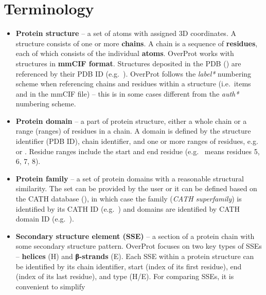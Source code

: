 \documentclass{article}
\begin{document}
\section{Terminology}

\begin{itemize}
  \item
    \textbf{Protein structure} -- a set of atoms with assigned 3D
    coordinates. A structure consists of one or more \textbf{chains}. A
    chain is a sequence of \textbf{residues}, each of which consists of the
    individual \textbf{atoms}. OverProt works with structures in
    \textbf{mmCIF format}. Structures deposited in the PDB 
    ()
    are referenced by their PDB ID (e.g.~). OverProt follows the
    \emph{label*} numbering scheme when referencing chains and residues
    within a structure (i.e.~items  and
     in the mmCIF file) -- this is in some cases
    different from the \emph{auth*} numbering scheme.
  \item
    \textbf{Protein domain} -- a part of protein structure, either a
    whole chain or a range (ranges) of residues in a chain. A domain is
    defined by the structure identifier (PDB ID), chain identifier, and one or more
    ranges of residues, e.g.~ or
    . Residue ranges include the start and end
    residue (e.g.~ means residues 5, 6, 7, 8).
  \item
    \textbf{Protein family} -- a set of protein domains with a reasonable
    structural similarity. The set can be provided by the user or it can
    be defined based on the CATH database (), 
    in which case the family (\emph{CATH superfamily}) is identified by its CATH ID
    (e.g.~) and domains are identified by CATH domain
    ID (e.g.~).
  \item
    \textbf{Secondary structure element (SSE)} -- a section of a protein
    chain with some secondary structure pattern. OverProt focuses on two
    key types of SSEs -- \textbf{helices} (H) and \textbf{β-strands} (E). Each
    SSE within a protein structure can be identified by its chain
    identifier, start (index of its first residue), end (index of its last
    residue), and type (H/E). For comparing SSEs, it is convenient to simplify

\end{itemize}
\end{document}
